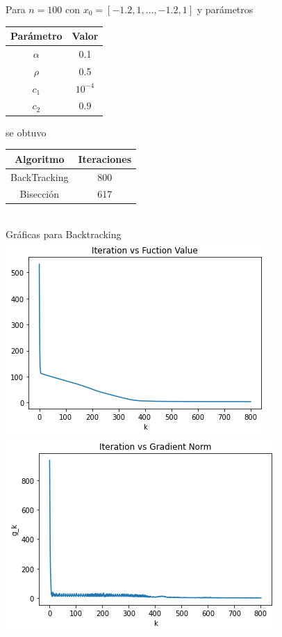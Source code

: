 \documentclass[11pt,letterpaper]{article}
\theoremstyle{definition}
\theoremstyle{definition}
\theoremstyle{definition}
\begin{document}
Para $ n = 100 $ con $ x_0 = [-1.2, 1, \dots, -1.2, 1] $ y parámetros
\begin{center}
	\begin{tabular}{cc}
		\hline
		Parámetro & Valor \\
		\hline
		$\alpha $ & 0.1 \\
		$ \rho $  & 0.5 \\
		$ c_1 $ & $ 10^{-4} $ \\
		$ c_2 $  & $ 0.9 $ \\
		\hline
	\end{tabular}
\end{center}
se obtuvo
\begin{center}
	\begin{tabular}{cc}
		\hline
		Algoritmo & Iteraciones \\
		\hline
		BackTracking & 800 \\
		Bisección  & 617 \\
		\hline
	\end{tabular}
	\\
	Gráficas para Backtracking
	\\
	\includegraphics[width=0.8\linewidth]{graficas/rosembrock_backtracking_100f}
	\\
	\includegraphics[width=0.8\linewidth]{graficas/rosembrock_backtracking_100g}

\end{center}
\end{document}
